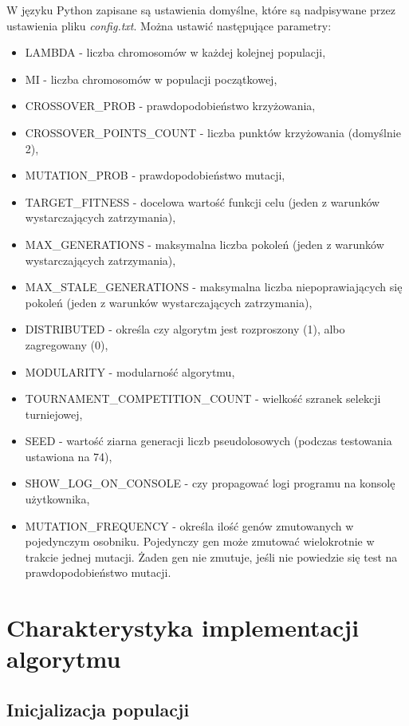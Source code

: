 W języku Python zapisane są ustawienia domyślne, które są nadpisywane przez ustawienia pliku \textit{config.txt}. Można ustawić następujące parametry:
\begin{itemize}
    \item LAMBDA - liczba chromosomów w każdej kolejnej populacji,
    \item MI - liczba chromosomów w populacji początkowej,
    \item CROSSOVER\_PROB - prawdopodobieństwo krzyżowania,
    \item CROSSOVER\_POINTS\_COUNT - liczba punktów krzyżowania (domyślnie 2),
    \item MUTATION\_PROB - prawdopodobieństwo mutacji,
    \item TARGET\_FITNESS - docelowa wartość funkcji celu (jeden z warunków wystarczających zatrzymania),
    \item MAX\_GENERATIONS - maksymalna liczba pokoleń (jeden z warunków wystarczających zatrzymania),
    \item MAX\_STALE\_GENERATIONS - maksymalna liczba niepoprawiających się pokoleń (jeden z warunków wystarczających zatrzymania),
    \item DISTRIBUTED - określa czy algorytm jest rozproszony (1), albo zagregowany (0),
    \item MODULARITY - modularność algorytmu,
    \item TOURNAMENT\_COMPETITION\_COUNT - wielkość szranek selekcji turniejowej,
    \item SEED - wartość ziarna generacji liczb pseudolosowych (podczas testowania ustawiona na 74),
    \item SHOW\_LOG\_ON\_CONSOLE - czy propagować logi programu na konsolę użytkownika,
    \item MUTATION\_FREQUENCY - określa ilość genów zmutowanych w pojedynczym osobniku. Pojedynczy gen może zmutować wielokrotnie w trakcie jednej mutacji. Żaden gen nie zmutuje, jeśli nie powiedzie się test na prawdopodobieństwo mutacji.
\end{itemize}

\section{Charakterystyka implementacji algorytmu}

\subsection{Inicjalizacja populacji}

